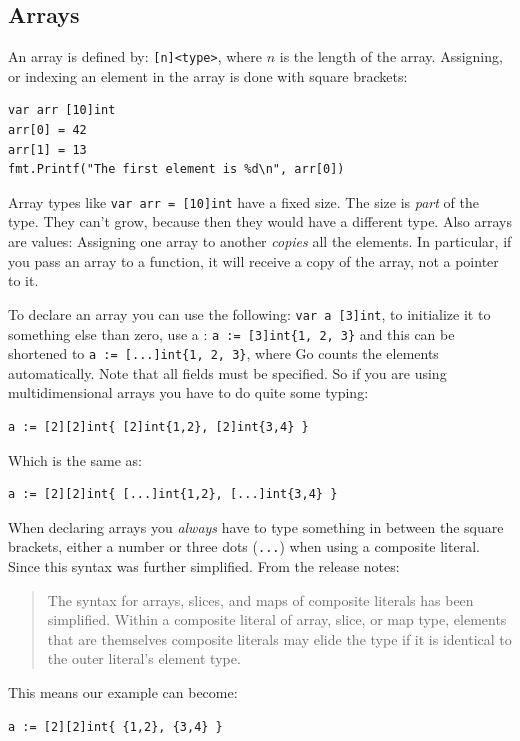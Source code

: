 \subsection{Arrays}
An array is defined by: \verb|[n]<type>|, where $n$ is the length
of the array.
Assigning, or indexing an element in the array is done with square
brackets:
\begin{lstlisting}
var arr [10]int
arr[0] = 42
arr[1] = 13
fmt.Printf("The first element is %d\n", arr[0])
\end{lstlisting}
Array types like \lstinline{var arr = [10]int} have a fixed size. The
size is \emph{part} of the type.
They can't grow, because then they would have a different type. Also arrays
are values: Assigning one array to another \emph{copies} all the elements.
In particular, if you pass an array to a function, it will receive a
copy of the array, not a pointer to it. 

To declare an array you can use the following: \lstinline{var a [3]int},
to initialize it to something else than zero, use a : \lstinline|a := [3]int{1, 2, 3}| and
this can be shortened to \lstinline|a := [...]int{1, 2, 3}|, where Go counts
the elements automatically. 
Note that all fields must be specified.  So if you are using multidimensional
arrays you have to do quite some typing:
\begin{lstlisting}
a := [2][2]int{ [2]int{1,2}, [2]int{3,4} }
\end{lstlisting}
Which is the same as:
\begin{lstlisting}
a := [2][2]int{ [...]int{1,2}, [...]int{3,4} }
\end{lstlisting}
When declaring arrays you \emph{always} have to type something in
between the square brackets, either a number or three dots (\verb|...|)
when using a composite literal. 
Since  this syntax was further simplified.
From the release notes:
\begin{quote}
The syntax for arrays, slices, and maps of composite literals has been
simplified. Within a composite literal of array, slice, or map type, elements
that are themselves composite literals may elide the type if it is identical to
the outer literal's element type. 
\end{quote}
This means our example can become:
\begin{lstlisting}
a := [2][2]int{ {1,2}, {3,4} }
\end{lstlisting}

